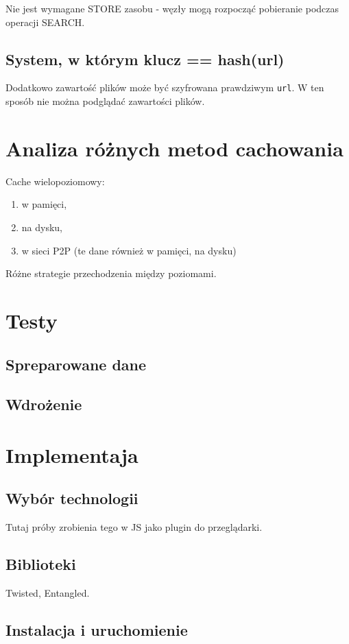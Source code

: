 \documentclass[a4paper,12pt]{scrartcl}
\newcommand{\f}{\texttt}
\begin{document}
Nie jest wymagane STORE zasobu - węzły mogą rozpocząć pobieranie podczas operacji SEARCH.

\subsection{System, w którym klucz == hash(url)}
Dodatkowo zawartość plików może być szyfrowana prawdziwym \f{url}.
W ten sposób nie można podglądać zawartości plików. 

\section{Analiza różnych metod cachowania}
Cache wielopoziomowy:
\begin{enumerate}
  \item w pamięci,
  \item na dysku,
  \item w sieci P2P (te dane również w pamięci, na dysku)
\end{enumerate}
Różne strategie przechodzenia między poziomami.

\section{Testy}
\subsection{Spreparowane dane}

\subsection{Wdrożenie}

\section{Implementaja}
\subsection{Wybór technologii}
Tutaj próby zrobienia tego w JS jako plugin do przeglądarki.
\subsection{Biblioteki}
Twisted, Entangled.
\subsection{Instalacja i uruchomienie}





\end{document}
